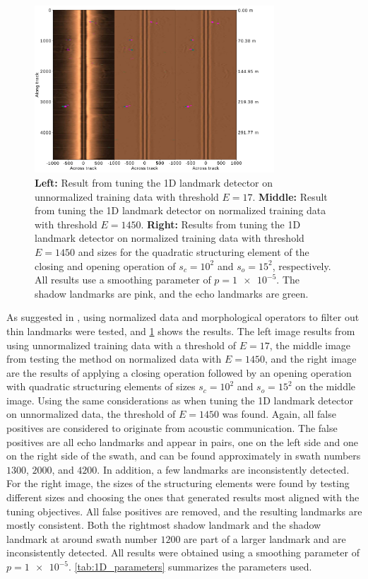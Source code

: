 \begin{figure} [ht!]
    \centering
    \includegraphics[trim=0cm 0cm 2.5cm 0cm, clip=true, width=0.8\textwidth]{figures/1D_result_training.pdf}
    \caption{\textbf{Left:} Result from tuning the 1D landmark detector on unnormalized training data with threshold $E = 17$. \textbf{Middle:} Result from tuning the 1D landmark detector on normalized training data with threshold $E = 1450$. \textbf{Right:} Results from tuning the 1D landmark detector on normalized training data with threshold $E = 1450$ and sizes for the quadratic structuring element of the closing and opening operation of $s_c = 10^2$ and $s_o = 15^2$, respectively. All results use a smoothing parameter of $p = \num{1e-5}$. The shadow landmarks are pink, and the echo landmarks are green.}
    \label{fig:1D_tuning_results}
\end{figure}

As suggested in \cite{Al-Rawi2017LandmarkImages}, using normalized data and morphological operators to filter out thin landmarks were tested, and \cref{fig:1D_tuning_results} shows the results. The left image results from using unnormalized training data with a threshold of $E = 17$, the middle image from testing the method on normalized data with $E = 1450$, and the right image are the results of applying a closing operation followed by an opening operation with quadratic structuring elements of sizes $s_c = 10^2$ and $s_o = 15^2$ on the middle image. Using the same considerations as when tuning the 1D landmark detector on unnormalized data, the threshold of $E = 1450$ was found. Again, all false positives are considered to originate from acoustic communication. The false positives are all echo landmarks and appear in pairs, one on the left side and one on the right side of the swath, and can be found approximately in swath numbers $1300$, $2000$, and $4200$. In addition, a few landmarks are inconsistently detected. For the right image, the sizes of the structuring elements were found by testing different sizes and choosing the ones that generated results most aligned with the tuning objectives. All false positives are removed, and the resulting landmarks are mostly consistent. Both the rightmost shadow landmark and the shadow landmark at around swath number $1200$ are part of a larger landmark and are inconsistently detected. All results were obtained using a smoothing parameter of $p = \num{1e-5}$. \cref{tab:1D_parameters} summarizes the parameters used. 

